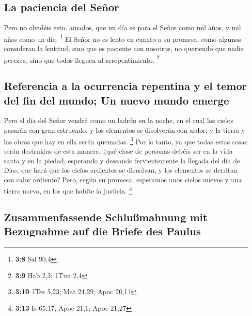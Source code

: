 \begin{paracol}{2}
\hypertarget{la-paciencia-del-seuxf1or}{%
\subsection{La paciencia del Señor}\label{la-paciencia-del-seuxf1or}}

 Pero no olvidéis esto, amados, que un día es para el
Señor como mil años, y mil años como un día. \footnote{\textbf{3:8} Sal
  90,4}  El Señor no es lento en cuanto a su promesa, como
algunos consideran la lentitud, sino que es paciente con nosotros, no
queriendo que nadie perezca, sino que todos lleguen al arrepentimiento.
\footnote{\textbf{3:9} Hab 2,3; 1Tim 2,4}

\hypertarget{referencia-a-la-ocurrencia-repentina-y-el-temor-del-fin-del-mundo-un-nuevo-mundo-emerge}{%
\subsection{Referencia a la ocurrencia repentina y el temor del fin del
mundo; Un nuevo mundo
emerge}\label{referencia-a-la-ocurrencia-repentina-y-el-temor-del-fin-del-mundo-un-nuevo-mundo-emerge}}

 Pero el día del Señor vendrá como un ladrón en la noche,
en el cual los cielos pasarán con gran estruendo, y los elementos se
disolverán con ardor; y la tierra y las obras que hay en ella serán
quemadas. \footnote{\textbf{3:10} 1Tes 5,23; Mat 24,29; Apoc 20,11}
 Por lo tanto, ya que todas estas cosas serán destruidas
de esta manera, ¿qué clase de personas debéis ser en la vida santa y en
la piedad,  esperando y deseando fervientemente la
llegada del día de Dios, que hará que los cielos ardientes se disuelvan,
y los elementos se derritan con calor ardiente?  Pero,
según su promesa, esperamos unos cielos nuevos y una tierra nueva, en
los que habite la justicia. \footnote{\textbf{3:13} Is 65,17; Apoc 21,1;
  Apoc 21,27}

\hypertarget{zusammenfassende-schluuxdfmahnung-mit-bezugnahme-auf-die-briefe-des-paulus}{%
\subsection{Zusammenfassende Schlußmahnung mit Bezugnahme auf die Briefe
des
Paulus}\label{zusammenfassende-schluuxdfmahnung-mit-bezugnahme-auf-die-briefe-des-paulus}}


\end{paracol}
